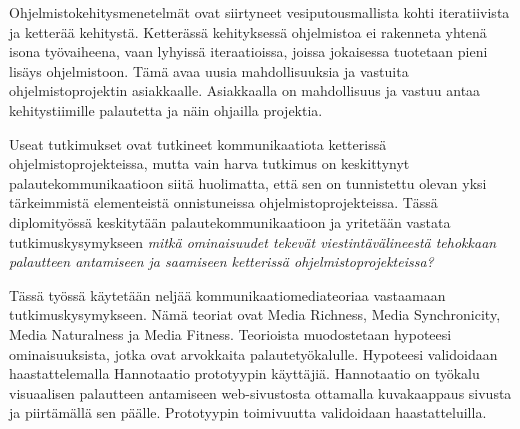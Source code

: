 \documentclass[english,12pt,a4paper,pdftex]{article}
\begin{document}
\begin{abstractpage}[finnish]

Ohjelmistokehitysmenetelmät ovat siirtyneet vesiputousmallista kohti iteratiivista ja ketterää kehitystä. Ketterässä kehityksessä ohjelmistoa ei rakenneta yhtenä isona työvaiheena, vaan lyhyissä iteraatioissa, joissa jokaisessa tuotetaan pieni lisäys ohjelmistoon. Tämä avaa uusia mahdollisuuksia ja vastuita ohjelmistoprojektin asiakkaalle. Asiakkaalla on mahdollisuus ja vastuu antaa kehitystiimille palautetta ja näin ohjailla projektia.

Useat tutkimukset ovat tutkineet kommunikaatiota ketterissä ohjelmistoprojekteissa, mutta vain harva tutkimus on keskittynyt palautekommunikaatioon siitä huolimatta, että sen on tunnistettu olevan yksi tärkeimmistä elementeistä onnistuneissa ohjelmistoprojekteissa. Tässä diplomityössä keskitytään palautekommunikaatioon ja yritetään vastata tutkimuskysymykseen \emph{mitkä ominaisuudet tekevät viestintävälineestä tehokkaan palautteen antamiseen ja saamiseen ketterissä ohjelmistoprojekteissa?}

Tässä työssä käytetään neljää kommunikaatiomediateoriaa vastaamaan tutkimuskysymykseen. Nämä teoriat ovat Media Richness, Media Synchronicity, Media Naturalness ja Media Fitness. Teorioista muodostetaan hypoteesi ominaisuuksista, jotka ovat arvokkaita palautetyökalulle. Hypoteesi validoidaan haastattelemalla Hannotaatio prototyypin käyttäjiä. Hannotaatio on työkalu visuaalisen palautteen antamiseen web-sivustosta ottamalla kuvakaappaus sivusta ja piirtämällä sen päälle. Prototyypin toimivuutta validoidaan haastatteluilla.


\end{abstractpage}
\end{document}
